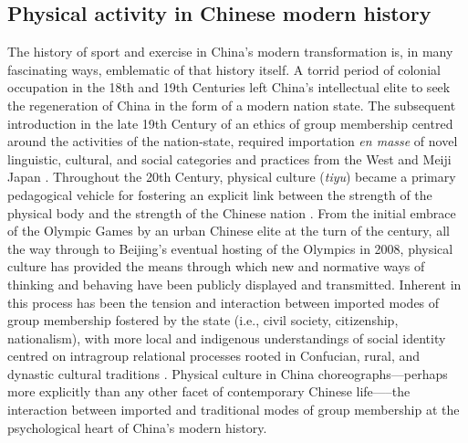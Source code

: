 \subsection{Physical activity in Chinese modern history}
The history of sport and exercise in China's modern transformation is, in many fascinating ways, emblematic of that history itself. A torrid period of colonial occupation in the 18th and 19th Centuries left China's intellectual elite to seek the regeneration of China in the form of a modern nation state.  The subsequent introduction in the late 19th Century of an ethics of group membership centred around the activities of the nation-state, required importation \textit{en masse} of novel linguistic, cultural, and social categories and practices from the West and Meiji Japan \citep{Liu1995}.  Throughout the 20th Century, physical culture (\textit{tiyu}) became a primary pedagogical vehicle for fostering an explicit link between the strength of the physical body and the strength of the Chinese nation \cites[32]{Morris2004}[49]{Brownell1995}.  From the initial embrace of the Olympic Games by an urban Chinese elite at the turn of the century, all the way through to Beijing's eventual hosting of the Olympics in 2008, physical culture has provided the means through which new and normative ways of thinking and behaving have been publicly displayed and transmitted.  Inherent in this process has been the tension and interaction between imported modes of group membership fostered by the state (i.e., civil society, citizenship, nationalism), with more local and indigenous understandings of social identity centred on intragroup relational processes rooted in Confucian, rural, and dynastic cultural traditions \citep{Fei1992}.  Physical culture in China choreographs---perhaps more explicitly than any other facet of contemporary Chinese life—--the interaction between imported and traditional modes of group membership at the psychological heart of China's modern history.

